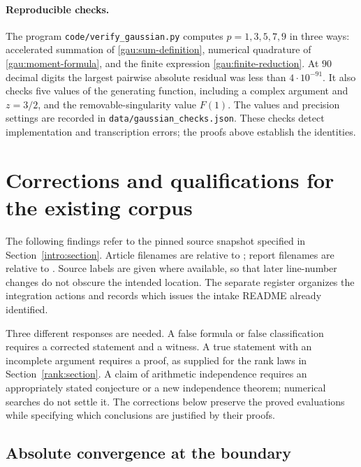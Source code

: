 \documentclass[11pt,a4paper]{article}
\theoremstyle{definition}
\theoremstyle{remark}
\numberwithin{equation}{section}
\begin{document}
\paragraph{Reproducible checks.}
The program \texttt{code/verify\_gaussian.py} computes $p=1,3,5,7,9$ in
three ways: accelerated summation of \eqref{gau:sum-definition}, numerical
quadrature of \eqref{gau:moment-formula}, and the finite expression
\eqref{gau:finite-reduction}. At $90$ decimal digits the largest pairwise
absolute residual was less than $4\cdot10^{-91}$. It also checks five
values of the generating function, including a complex argument and
$z=3/2$, and the removable-singularity value $F(1)$.
The values and precision settings are recorded in
\texttt{data/gaussian\_checks.json}. These checks detect implementation
and transcription errors; the proofs above establish the identities.

\section{Corrections and qualifications for the existing corpus}
\label{audit:section}

The following findings refer to the pinned source snapshot specified
in Section~\ref{intro:section}. Article filenames are relative to
; report filenames are
relative to .
Source labels are given where available, so that later line-number
changes do not obscure the intended location.
The separate  register organizes the integration
actions and records which issues the intake README already identified.

Three different responses are needed. A false formula or false
classification requires a corrected statement and a witness. A true
statement with an incomplete argument requires a proof, as supplied
for the rank laws in Section~\ref{rank:section}. A claim of arithmetic
independence requires an appropriately stated conjecture or a new
independence theorem; numerical searches do not settle it.
The corrections below preserve the proved evaluations while specifying
which conclusions are justified by their proofs.

\subsection{Absolute convergence at the boundary}
\label{audit:poly:convergence}
\end{document}
